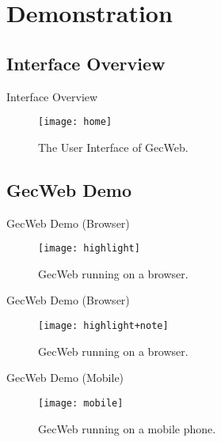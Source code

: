 \section{Demonstration}

\subsection{Interface Overview}

\begin{frame}{Interface Overview}
  \begin{figure}
    \texttt{[image: home]}
    \caption{The User Interface of GecWeb.}
  \end{figure}
\end{frame}

\subsection{GecWeb Demo}

\begin{frame}{GecWeb Demo (Browser)}
  \begin{figure}
    \texttt{[image: highlight]}
    \caption{GecWeb running on a browser.}
  \end{figure}
\end{frame}

\begin{frame}{GecWeb Demo (Browser)}
  \begin{figure}
    \texttt{[image: highlight+note]}
    \caption{GecWeb running on a browser.}
  \end{figure}
\end{frame}

\begin{frame}{GecWeb Demo (Mobile)}
  \begin{figure}
    \texttt{[image: mobile]}
    \caption{GecWeb running on a mobile phone.}
  \end{figure}
\end{frame}

